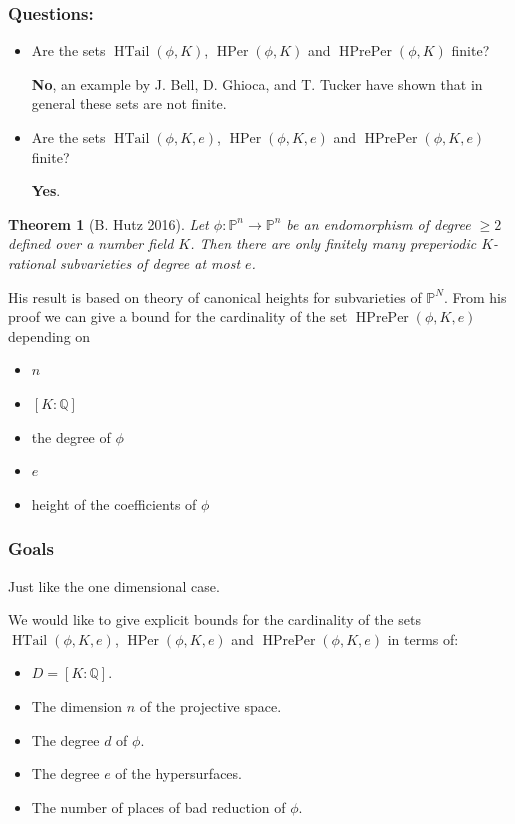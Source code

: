 \documentclass{beamer}
\def\PP{{\mathbb P}}
\def\QQ{{\mathbb Q}}
\DeclareMathOperator{\HTail}{HTail}
\DeclareMathOperator{\HPer}{HPer}
\DeclareMathOperator{\HPrePer}{HPrePer}
\theoremstyle{thmstyle}
\theoremstyle{thmstyle}
\newtheorem*{mythm}{Theorem}
\theoremstyle{mystyle}
\theoremstyle{qstnstyle}
\begin{document}
\begin{frame}
\frametitle{Questions:}
\begin{itemize}
\item Are the sets $\HTail(\phi,K)$, $\HPer(\phi,K)$ and $\HPrePer(\phi,K)$ finite? 


\textbf{No}, an example by J. Bell, D. Ghioca, and T. Tucker have shown that in general these sets are not finite. 



\item Are the sets  $\HTail(\phi,K,e)$, $\HPer(\phi,K,e)$ and $\HPrePer(\phi,K,e)$ finite?

  \textbf{Yes}.


\end{itemize}

\end{frame}

\begin{frame}


\begin{mythm}[B. Hutz 2016]
Let $\phi : \PP^n \to \PP^n$ be an endomorphism of degree $\geq{2}$ defined over a number field $K$. Then there are only finitely many preperiodic $K$-rational subvarieties of degree at most $e$.
\end{mythm}


His result is based on theory of canonical heights for subvarieties of $\PP^N$. From his proof we can give a bound for the cardinality of the set $\HPrePer(\phi,K,e)$ depending on
\begin{itemize}
\item $n$
\item $[K:\QQ]$
\item the degree of $\phi$
\item $e$
\item height of the coefficients of $\phi$
\end{itemize}
\end{frame}

\begin{frame}
\frametitle{Goals}
Just like the one dimensional case. 

We would like to give explicit bounds for the cardinality of the sets $\HTail(\phi,K,e)$, $\HPer(\phi,K,e)$ and $\HPrePer(\phi,K,e)$ in terms of: 
\begin{itemize}
\item  $D=[K: \QQ]$. 

\item The dimension $n$ of the projective space.  

\item The degree $d$ of $\phi$.

\item The degree $e$ of the hypersurfaces.  

\item  The number of places of bad reduction of $\phi$.
\end{itemize}


\end{frame}
\end{document}
